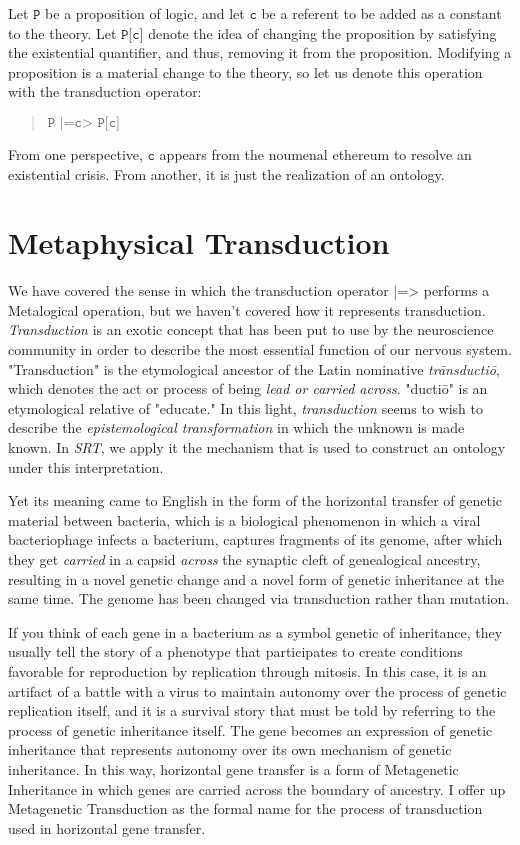 \documentclass[runningheads]{llncs}
\begin{document}
Let $\texttt{P}$ be a proposition of logic, and let $\texttt{c}$ be a referent to be added as a constant to the theory. Let $\texttt{P[c]}$ denote the idea of changing the proposition by satisfying the existential quantifier, and thus, removing it from the proposition. Modifying a proposition is a material change to the theory, so let us denote this operation with the transduction operator:

\begin{quote}
$\texttt{P |=c> P[c]}$
\end{quote}

From one perspective, $\texttt{c}$ appears from the noumenal ethereum to resolve an existential crisis. From another, it is just the realization of an ontology.

\section{Metaphysical Transduction}

We have covered the sense in which the transduction operator |=> performs a Metalogical operation, but we haven't covered how it represents transduction. \emph{Transduction} is an exotic concept that has been put to use by the neuroscience community in order to describe the most essential function of our nervous system\cite{Hagins1970}. "Transduction" is the etymological ancestor of the Latin nominative \emph{trānsductiō}, which denotes the act or process of being \emph{lead or carried across}. "ductiō" is an etymological relative of "educate." In this light, \emph{transduction} seems to wish to describe the \emph{epistemological transformation} in which the unknown is made known. In \emph{SRT}, we apply it the mechanism that is used to construct an ontology under this interpretation.

Yet its meaning came to English in the form of the horizontal transfer of genetic material between bacteria, which is a biological phenomenon in which a viral bacteriophage infects a bacterium, captures fragments of its genome, after which they get \emph{carried} in a capsid \emph{across} the synaptic cleft of genealogical ancestry, resulting in a novel genetic change and a novel form of genetic inheritance at the same time. The genome has been changed via transduction rather than mutation\cite{Zinder1952}.

If you think of each gene in a bacterium as a symbol genetic of inheritance, they usually tell the story of a phenotype that participates to create conditions favorable for reproduction by replication through mitosis. In this case, it is an artifact of a battle with a virus to maintain autonomy over the process of genetic replication itself, and it is a survival story that must be told by referring to the process of genetic inheritance itself. The gene becomes an expression of genetic inheritance that represents autonomy over its own mechanism of genetic inheritance. In this way, horizontal gene transfer is a form of Metagenetic Inheritance in which genes are carried across the boundary of ancestry. I offer up Metagenetic Transduction as the formal name for the process of transduction used in horizontal gene transfer.
\end{document}
